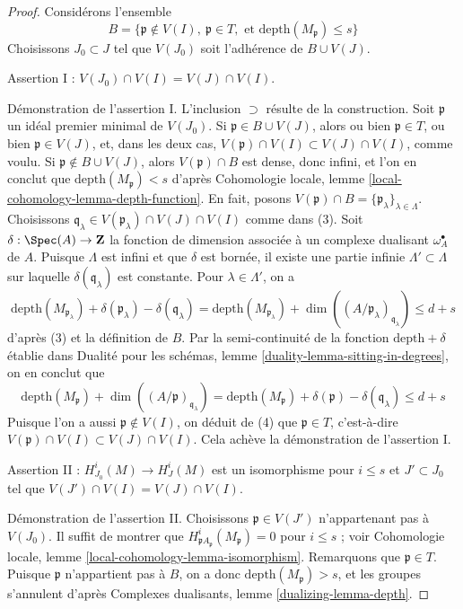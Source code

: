 \begin{proof}
Considérons l'ensemble
$$
B = \{\mathfrak p \not \in V(I),\ \mathfrak p \in T,\text{ et }
\text{depth}(M_\mathfrak p) \leq s\}
$$
Choisissons $J_0 \subset J$ tel que $V(J_0)$ soit l'adhérence de $B \cup V(J)$.

\medskip\noindent
Assertion I : $V(J_0) \cap V(I) = V(J) \cap V(I)$.

\medskip\noindent
Démonstration de l'assertion I. L'inclusion $\supset$ résulte de la construction.
Soit $\mathfrak p$ un idéal premier minimal de $V(J_0)$.
Si $\mathfrak p \in B \cup V(J)$, alors ou bien $\mathfrak p \in T$,
ou bien $\mathfrak p \in V(J)$, et, dans les deux cas,
$V(\mathfrak p) \cap V(I) \subset V(J) \cap V(I)$, comme voulu.
Si $\mathfrak p \not \in B \cup V(J)$, alors
$V(\mathfrak p) \cap B$ est dense, donc infini, et l'on en conclut que
$\text{depth}(M_\mathfrak p) < s$ d'après
Cohomologie locale, lemme \ref{local-cohomology-lemma-depth-function}.
En fait, posons
$V(\mathfrak p) \cap B = \{\mathfrak p_\lambda\}_{\lambda \in \Lambda}$.
Choisissons $\mathfrak q_\lambda \in V(\mathfrak p_\lambda) \cap V(J) \cap V(I)$
comme dans (3).
Soit $\delta : \Spec(A) \to \mathbf{Z}$ la fonction de dimension
associée à un complexe dualisant $\omega_A^\bullet$ de $A$.
Puisque $\Lambda$ est infini et que $\delta$ est bornée,
il existe une partie infinie $\Lambda' \subset \Lambda$ sur laquelle
$\delta(\mathfrak q_\lambda)$ est constante. Pour
$\lambda \in \Lambda'$, on a
$$
\text{depth}(M_{\mathfrak p_\lambda}) +
\delta(\mathfrak p_\lambda) - \delta(\mathfrak q_\lambda) =
\text{depth}(M_{\mathfrak p_\lambda}) +
\dim((A/\mathfrak p_\lambda)_{\mathfrak q_\lambda})
\leq d + s
$$
d'après (3) et la définition de $B$. Par la semi-continuité de
la fonction $\text{depth} + \delta$ établie dans
Dualité pour les schémas, lemme \ref{duality-lemma-sitting-in-degrees},
on en conclut que
$$
\text{depth}(M_\mathfrak p) +
\dim((A/\mathfrak p)_{\mathfrak q_\lambda}) =
\text{depth}(M_\mathfrak p) + \delta(\mathfrak p) - \delta(\mathfrak q_\lambda)
\leq d + s
$$
Puisque l'on a aussi $\mathfrak p \not \in V(I)$, on déduit de (4) que
$\mathfrak p \in T$, c'est-à-dire
$V(\mathfrak p) \cap V(I) \subset V(J) \cap V(I)$. Cela achève la
démonstration de l'assertion I.

\medskip\noindent
Assertion II : $H^i_{J_0}(M) \to H^i_J(M)$ est un isomorphisme pour $i \leq s$
et $J' \subset J_0$ tel que $V(J') \cap V(I) = V(J) \cap V(I)$.

\medskip\noindent
Démonstration de l'assertion II. Choisissons $\mathfrak p \in V(J')$ n'appartenant pas à $V(J_0)$.
Il suffit de montrer que $H^i_{\mathfrak pA_\mathfrak p}(M_\mathfrak p) = 0$
pour $i \leq s$ ; voir
Cohomologie locale, lemme \ref{local-cohomology-lemma-isomorphism}.
Remarquons que $\mathfrak p \in T$. Puisque $\mathfrak p$ n'appartient pas à $B$,
on a donc $\text{depth}(M_\mathfrak p) > s$, et les groupes s'annulent d'après
Complexes dualisants, lemme \ref{dualizing-lemma-depth}.


\end{proof}
